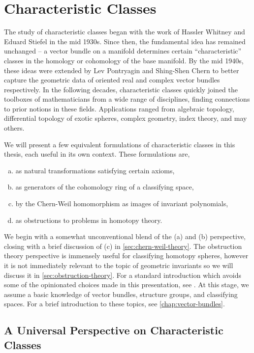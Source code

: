 \pagebreak
\section{Characteristic Classes}\label{sec:characteristic-classes}
The study of characteristic classes began with the work of Hassler Whitney and Eduard Stiefel in the mid 1930s. Since then, the fundamental idea has remained unchanged -- a vector bundle on a manifold determines certain ``characteristic'' classes in the homology or cohomology of the base manifold.
By the mid 1940s, these ideas were extended by Lev Pontryagin and Shing-Shen Chern to better capture the geometric data of oriented real and complex vector bundles respectively. In the following decades, characteristic classes quickly joined the toolboxes of mathematicians from a wide range of disciplines, finding connections to prior notions in these fields.
Applications ranged from algebraic topology, differential topology of exotic spheres, complex geometry, index theory, and may others.

We will present a few equivalent formulations of characteristic classes in this thesis, each useful in its own context. These formulations are,
\begin{enumerate}[(a)]
	\item as natural transformations satisfying certain axioms,
	\item as generators of the cohomology ring of a classifying space,
	\item by the Chern-Weil homomorphism as images of invariant polynomials,
	\item as obstructions to problems in homotopy theory.
\end{enumerate}
We begin with a somewhat unconventional blend of the (a) and (b) perspective, closing with a brief discussion of (c) in \cref{sec:chern-weil-theory}. The obstruction theory perspective is immensely useful for classifying homotopy spheres, however it is not immediately relevant to the topic of geometric invariants so we will discuss it in \cref{sec:obstruction-theory}. For a standard introduction which avoids some of the opinionated choices made in this presentation, see \cite{milnorstasheff1974}.
At this stage, we assume a basic knowledge of vector bundles, structure groups, and classifying spaces. For a brief introduction to these topics, see \cref{chap:vector-bundles}.

\subsection{A Universal Perspective on Characteristic Classes}\label{sec:axiomatic-characteristic-classes}

